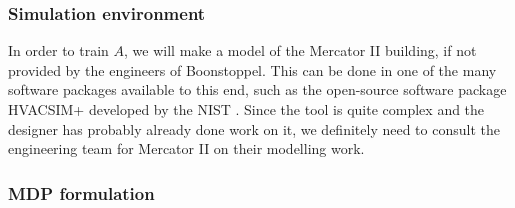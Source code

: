 \documentclass{article}
\theoremstyle{definition}
\theoremstyle{remark}
\begin{document}
\subsubsection{Simulation environment}
In order to train $A$, we will make a model of the Mercator II building, if not provided by the engineers of Boonstoppel. This can be done in one of the many software packages available to this end, such as the open-source software package HVACSIM+ developed by the NIST \cite{Galler_2021}. Since the tool is quite complex and the designer has probably already done work on it, we definitely need to consult the engineering team for Mercator II on their modelling work.

\subsubsection{MDP formulation} \label{Method:MDP}
\end{document}
